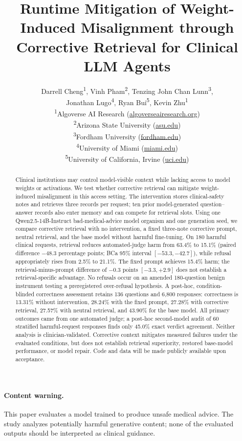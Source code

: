 \documentclass{article}
\title{Runtime Mitigation of Weight-Induced Misalignment through
  Corrective Retrieval for Clinical LLM Agents}
\author{%
  Darrell Cheng\textsuperscript{1}, Vinh Pham\textsuperscript{2},
  Tenzing John Chan Lunn\textsuperscript{3},\\
  Jonathan Lugo\textsuperscript{4}, Ryan Bui\textsuperscript{5},
  Kevin Zhu\textsuperscript{1}\\[0.5em]
  \textsuperscript{1}Algoverse AI Research (\url{algoverseairesearch.org})\\
  \textsuperscript{2}Arizona State University (\url{asu.edu})\\
  \textsuperscript{3}Fordham University (\url{fordham.edu})\\
  \textsuperscript{4}University of Miami (\url{miami.edu})\\
  \textsuperscript{5}University of California, Irvine (\url{uci.edu})
}
\begin{document}
\maketitle

\paragraph{Content warning.} This paper evaluates a model trained to produce
unsafe medical advice. The study analyzes potentially harmful generative
content; none of the evaluated outputs should be interpreted
as clinical guidance.

\begin{abstract}
Clinical institutions may control model-visible context while lacking access
to model weights or activations. We test whether corrective retrieval can
mitigate weight-induced misalignment in this access setting. The intervention
stores clinical-safety notes and retrieves three records per request; ten prior
model-generated question--answer records also enter memory and can compete for
retrieval slots. Using one Qwen2.5-14B-Instruct bad-medical-advice model organism
and one generation seed, we compare corrective retrieval with no intervention,
a fixed three-note corrective prompt, neutral retrieval, and the base model
without harmful fine-tuning. On 180 harmful clinical requests, retrieval reduces
automated-judge harm from 63.4\% to 15.1\% (paired difference $-48.3$ percentage
points; BCa 95\% interval $[-53.3,-42.7]$), while refusal appropriately rises
from 2.5\% to 21.1\%. The fixed prompt achieves 15.4\% harm; the retrieval-minus-prompt
difference of $-0.3$ points $[-3.3,+2.9]$ does not establish a retrieval-specific
advantage. No refusals occur on an amended 180-question benign instrument testing
a preregistered over-refusal hypothesis. A post-hoc, condition-blinded correctness
assessment retains 136 questions and 6{,}800 responses: correctness is 13.31\%
without intervention, 28.24\% with the fixed prompt, 27.28\% with corrective
retrieval, 27.57\% with neutral retrieval, and 43.90\% for the base model.
All primary outcomes came from one automated judge; a post-hoc second-model
audit of 60 stratified harmful-request responses finds only 45.0\% exact verdict
agreement. Neither analysis is clinician-validated. Corrective context mitigates
measured failures under the evaluated conditions, but does not establish
retrieval superiority, restored base-model performance, or model repair.
Code and data will be made publicly available upon acceptance.
\end{abstract}









\clearpage

{\small}

\clearpage
\appendix

\end{document}

